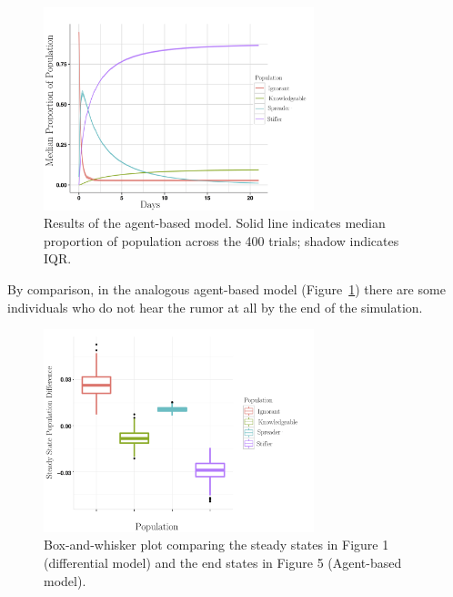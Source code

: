 \begin{figure}[H]
\captionsetup{width=0.8\textwidth}
\centering
    \includegraphics[width=0.7\textwidth]{figures/figure5}
  \caption{Results of the agent-based model.
Solid line indicates median proportion of population across the 400 trials; shadow indicates IQR.}
\label{fig:figure5}
\end{figure}

By comparison, in the analogous agent-based model (Figure~\ref{fig:figure5}) there are some individuals who do not hear the rumor at all by the end of the simulation.

\begin{figure}[H]
\captionsetup{width=0.8\textwidth}
\centering
    \includegraphics[width=0.7\textwidth]{figures/figure6}
  \caption{Box-and-whisker plot comparing the steady states in Figure 1 (differential model) and the end states in Figure 5 (Agent-based model).}
\label{fig:figure6}
\end{figure}


